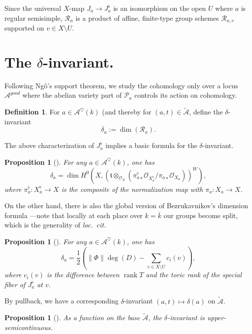 \documentclass[openany]{amsbook}
\newtheorem{proposition}[theorem]{Proposition}
\theoremstyle{definition}
\newtheorem{definition}[theorem]{Definition}
\theoremstyle{remark}
\numberwithin{equation}{section}
\renewcommand{\O}{\mathcal{O}}
\newcommand{\cA}{\mathcal{A}}
\newcommand{\cR}{\mathcal{R}}
\newcommand{\cP}{\mathcal{P}}
\newcommand{\ol}[1]{\overline{#1}}
\renewcommand{\-}{\operatorname{-}}
\newcommand{\on}[1]{\operatorname{#1}}
\newcommand{\rank}{\on{rank}}
\newcommand{\good}{\mathit{good}}
\newcommand{\ctA}{\widetilde{\cA}}
\newcommand{\ft}{\mathfrak{t}}
\begin{document}
Since the universal $X$-map $J_a \to J_a^\flat$ is an isomorphism on the open $U$ where $a$ is regular semisimple, $\cR_a$ is a product of affine, finite-type group schemes $\cR_{a,v}$ supported on $v \in X \setminus U$. 

\section{\texorpdfstring{The $\delta$-invariant.}{The delta-invariant.}}
Following Ng\^{o}'s support theorem, we study the cohomology only over a locus $\cA^{\good}$ where the abelian variety part of $\cP_a$ controls its action on cohomology.
\begin{definition}
    For $a \in \cA^{\heartsuit}(k)$ (and thereby for $(a,t) \in \ctA$, define the $\delta$-invariant
    $$
        \delta_a := \dim(\cR_a).
    $$
\end{definition}


The above characterization of $J_a^\flat$ implies a basic formula for the $\delta$-invariant.

\begin{proposition}[{{\cite[Corollaire 4.9.4]{ngofl}}}]\label{prop.norm.form.delta}
    For any $a \in \cA^{\heartsuit}(k)$, one has
    $$
        \delta_a = \dim H^0(X, (\ft \otimes_{\O_X} (\pi_{a \star}^{\flat} \O_{X_a^\flat}/\pi_{a\star} \O_{X_a}))^W),
    $$
    where $\pi_a^\flat : X_a^\flat \to X$ is the composite of the normalization map with $\pi_a : X_a \to X$.
\end{proposition}

On the other hand, there is also the global version of Bezrukavnikov's dimension formula \cite{bezrukavnikovdimension}---note that locally at each place over $k = \ol{k}$ our groups become split, which is the generality of \textit{loc.\ cit.}

\begin{proposition}[{{\cite[Proposition 4.9.5]{ngofl}}}]\label{prop.bezru.form.delta}
    For any $a \in \cA^{\heartsuit}(k)$, one has
    $$
        \delta_a = \frac{1}{2} \left(\|\Phi\| \deg(D) - \sum_{v \in X \setminus U} c_i(v) \right),
    $$
    where $c_i(v)$ is the difference between $\rank T$ and the toric rank of the special fiber of $J_a^\flat$ at $v$. 
\end{proposition}

By pullback, we have a corresponding $\delta$-invariant $(a, t) \mapsto \delta(a)$ on $\ctA$. 

\begin{proposition}[{{\cite[\S 5.6, Lemme 5.6.3]{ngofl}}}]
    As a function on the base $\ctA$, the $\delta$-invariant is upper-semicontinuous.
                                                                                        \end{proposition}
\end{document}
